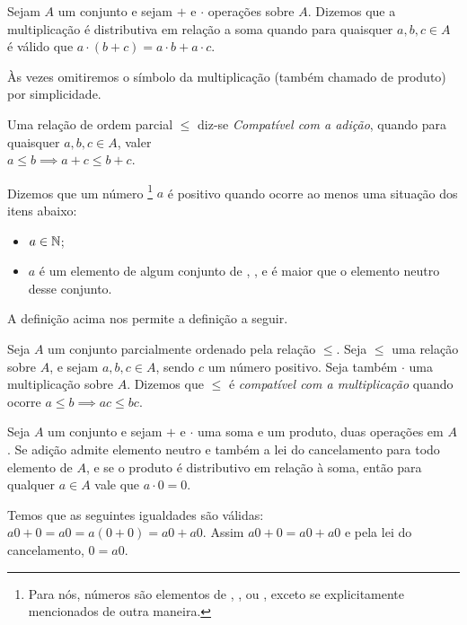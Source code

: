 \documentclass[../main.tex]{subfiles}
\begin{document}
\begin{defi}
    Sejam $A$ um conjunto e sejam $+$ e $\cdot$ operações sobre $A$. Dizemos que a multiplicação é distributiva em relação a soma quando para quaisquer $a, b, c \in A$ é válido que $a \cdot (b + c) = a \cdot b + a\cdot c$.
\end{defi}
Às vezes omitiremos o símbolo da multiplicação (também chamado de produto) por simplicidade.
\begin{defi}
    Uma relação de ordem parcial $\leq$ diz-se \emph{Compatível com a adição}, quando para quaisquer $a,b,c \in A$, 
    valer \\ $a \leq b \implies a + c \leq b + c$.
\end{defi}

\begin{defi}\label{agb-defPositivo}
    Dizemos que um número \footnote{Para nós, números são elementos de \N, \Z, \Q ou \R, exceto se explicitamente mencionados de outra maneira.} $a$ é positivo quando ocorre ao menos uma situação dos itens abaixo:
    \begin{itemize}
        \item $a \in \mathbb{N}$;
        \item $a$ é um elemento de algum conjunto de \Z, \Q, \R e é maior que o elemento neutro desse conjunto.
    \end{itemize}
\end{defi}

A definição acima nos permite a definição a seguir.
\begin{defi}
    Seja $A$ um conjunto parcialmente ordenado pela relação $\leq$. Seja $\leq$ uma relação sobre $A$, e sejam $a,b,c \in A$, sendo $c$ um número positivo. Seja também $\cdot$ uma multiplicação sobre $A$.
    Dizemos que $\leq$ é \emph{compatível com a multiplicação} quando ocorre $a \leq b \implies ac \leq bc$.
\end{defi}

{\textoRemovido
\begin{prop}
    Seja $A$ um conjunto e sejam $+$ e $\cdot$ uma soma e um produto, duas operações em $A$. Se adição admite elemento neutro e também a lei do cancelamento para todo elemento de $A$, e se o produto é distributivo em relação à soma, então para qualquer $a \in A$ vale que $a \cdot 0 = 0$.
\end{prop}
\begin{dem}
 Temos que as seguintes igualdades são válidas: $a0+0 = a0 = a(0+0) = a0+a0$. Assim $a0+0 = a0+a0$ e pela lei do cancelamento, $0=a0$.
\end{dem}

}
\end{document}
